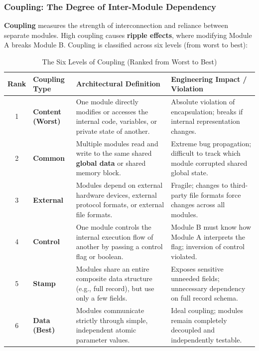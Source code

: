 \subsubsection{Coupling: The Degree of Inter-Module Dependency}
\textbf{Coupling} measures the strength of interconnection and reliance between separate modules. High coupling causes \textbf{ripple effects}, where modifying Module A breaks Module B. Coupling is classified across six levels (from worst to best):
\begin{table}[htbp]
\centering
\small
\caption{The Six Levels of Coupling (Ranked from Worst to Best)}
\label{tab:coupling_levels}
\begin{tabularx}{\textwidth}{c l p{5cm} X}
\toprule
\textbf{Rank} & \textbf{Coupling Type} & \textbf{Architectural Definition} & \textbf{Engineering Impact / Violation} \\
\midrule
1 & \textbf{Content (Worst)} & One module directly modifies or accesses the internal code, variables, or private state of another. & Absolute violation of encapsulation; breaks if internal representation changes. \\
2 & \textbf{Common} & Multiple modules read and write to the same shared \textbf{global data} or shared memory block. & Extreme bug propagation; difficult to track which module corrupted shared global state. \\
3 & \textbf{External} & Modules depend on external hardware devices, external protocol formats, or external file formats. & Fragile; changes to third-party file formats force changes across all modules. \\
4 & \textbf{Control} & One module controls the internal execution flow of another by passing a control flag or boolean. & Module B must know how Module A interprets the flag; inversion of control violated. \\
5 & \textbf{Stamp} & Modules share an entire composite data structure (e.g., full record), but use only a few fields. & Exposes sensitive unneeded fields; unnecessary dependency on full record schema. \\
6 & \textbf{Data (Best)} & Modules communicate strictly through simple, independent atomic parameter values. & Ideal coupling; modules remain completely decoupled and independently testable. \\
\bottomrule
\end{tabularx}
\end{table}

